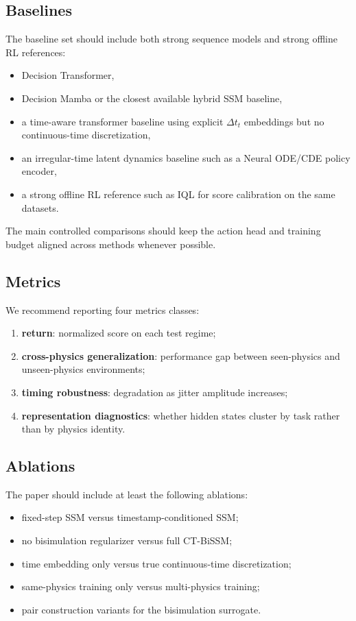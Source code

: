\documentclass[11pt]{article}
\newcommand{\dt}{\Delta t}
\begin{document}
\subsection{Baselines}

The baseline set should include both strong sequence models and strong offline RL references:
\begin{itemize}
    \item Decision Transformer,
    \item Decision Mamba or the closest available hybrid SSM baseline,
    \item a time-aware transformer baseline using explicit $\dt_t$ embeddings but no continuous-time discretization,
    \item an irregular-time latent dynamics baseline such as a Neural ODE/CDE policy encoder,
    \item a strong offline RL reference such as IQL for score calibration on the same datasets.
\end{itemize}

The main controlled comparisons should keep the action head and training budget aligned across methods whenever possible.

\subsection{Metrics}

We recommend reporting four metrics classes:
\begin{enumerate}
    \item \textbf{return}: normalized score on each test regime;
    \item \textbf{cross-physics generalization}: performance gap between seen-physics and unseen-physics environments;
    \item \textbf{timing robustness}: degradation as jitter amplitude increases;
    \item \textbf{representation diagnostics}: whether hidden states cluster by task rather than by physics identity.
\end{enumerate}

\subsection{Ablations}

The paper should include at least the following ablations:
\begin{itemize}
    \item fixed-step SSM versus timestamp-conditioned SSM;
    \item no bisimulation regularizer versus full CT-BiSSM;
    \item time embedding only versus true continuous-time discretization;
    \item same-physics training only versus multi-physics training;
    \item pair construction variants for the bisimulation surrogate.
\end{itemize}
\end{document}
